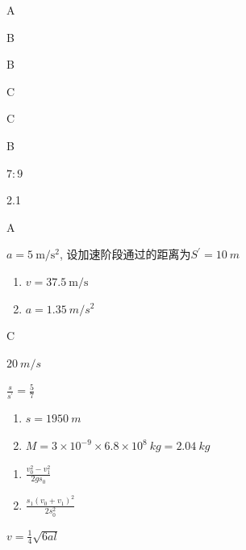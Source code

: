 \item A
\item B
\item B
\item C
\item C
\item B
\item $ 7:9 $
\item 2.1
\item A
\item $a = 5\ \mathrm { m } / \mathrm { s } ^ { 2 }$, 设加速阶段通过的距离为$ S ^{\prime } =10\ m $
\item \begin {enumerate} \renewcommand {\labelenumi }{\arabic {enumi}.} \item $v = 37.5 \ \mathrm { m } / \mathrm { s }$ \item $ a=1.35\ m/s^{2} $ \par \end {enumerate} \par \par 
\item C
\item $ 20\ m/s $
\item $\frac { s } { s ^ { \prime } } = \frac { 5 } { 7 }$
\item \begin {enumerate} \renewcommand {\labelenumi }{\arabic {enumi}.} \item $ s=1950\ m $ \item $ M=3\times 10^{-9} \times 6.8 \times 10^{8} \ kg = 2.04\ kg $ \par \end {enumerate} \par \par 
\item \par \begin {enumerate} \renewcommand {\labelenumi }{\arabic {enumi}.} \item $\frac { v _ { 0 } ^ { 2 } - v _ { 1 } ^ { 2 } } { 2 g s _ { 0 } }$ \item $\frac { s _ { 1 } \left ( v _ { 0 } + v _ { 1 } \right ) ^ { 2 } } { 2 s _ { 0 } ^ { 2 } }$ \par \par \par \end {enumerate} \par \par \par 
\item $v = \frac { 1 } { 4 } \sqrt { 6 a l }$
